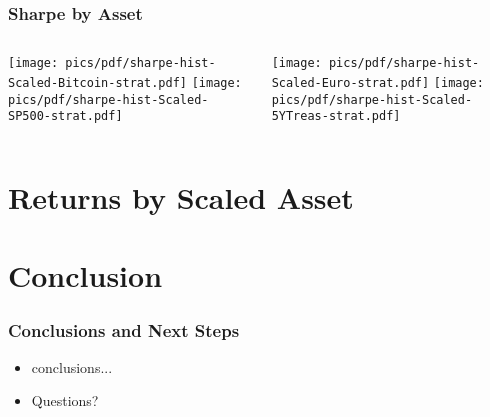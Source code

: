 \documentclass[9pt]{beamer}
\begin{document}
\begin{frame}
    \frametitle{Sharpe by Asset}
    \begin{columns}
    \begin{column}{.3\textwidth}
    \texttt{[image: pics/pdf/sharpe-hist-Scaled-Bitcoin-strat.pdf]}
    \texttt{[image: pics/pdf/sharpe-hist-Scaled-SP500-strat.pdf]}
    \end{column}
    \begin{column}{.3\textwidth}
    \texttt{[image: pics/pdf/sharpe-hist-Scaled-Euro-strat.pdf]}
    \texttt{[image: pics/pdf/sharpe-hist-Scaled-5YTreas-strat.pdf]}
    \end{column}
    \end{columns}
\end{frame}
\section{Returns by Scaled Asset} 

\section{Conclusion} 
\begin{frame}
    \frametitle{Conclusions and Next Steps}
    \begin{itemize}
        \item conclusions...
        \item Questions?
    \end{itemize}
\end{frame}
\end{document}
